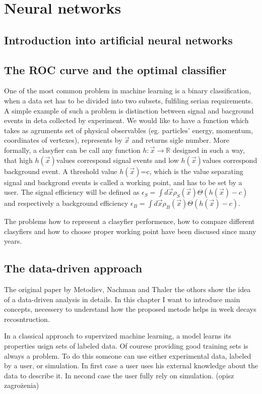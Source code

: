 \newcommand{\h}{$h(\vec x)$}
\newcommand{\e}{\epsilon}
\chapter{Neural networks}\label{chapter:symmetries}

\section{Introduction into artificial neural networks}

\section{The ROC curve and the optimal classifier}
One of the most common problem in machine learning is a binary classification, when a data set has to be divided into two subsets, fulfiling serian requirements. A simple example of such a problem is distinction between signal and bacground events in deta collected by experiment. We would like to have a function which takes as agruments set of physical observables (eg. particles' energy, momentum, coordinates of vertexes), represents by $\vec{x}$ and returns sigle number. More formally, a clasyfier can be call any function $h: \vec x \rightarrow \mathbb{R}$ designed in such a way, that high \h values correspond signal events and low \h values correspond background event. A threshold value  \h =c, which is the value separating signal and backgrond events is called a working point, and has to be set by a user. The signal efficiency will be defined as $\e_S=\int d\vec x \rho_S(\vec x) \Theta(h(\vec x) -c)$ and respectively a background efficiency $\e_B=\int d\vec x \rho_B(\vec x) \Theta(h(\vec x) -c)$.

The problems how to represent a clasyfier performence, how to compare different clasyfiers and how to choose proper working point have been discused since many years. 

\section{The data-driven approach}
The original paper by Metodiev, Nachman and Thaler \cite{Metodiev_2017} the othors show the idea of a data-driven analysis in details. In this chapter I want to introduce main concepts, necessery to understand how the proposed metode helps in week decays recosntruction.

In a classical approach to supervized machine learning, a model learns its properties usign sets of labeled data. Of courese providing good training sets is always a problem. To do this someone can use either experimental data, labeled by a user, or simulation. In first case a user uses his external knowledge about the data to describe it. In necond case the user fully rely on simulation. (opisz zagrożenia)


